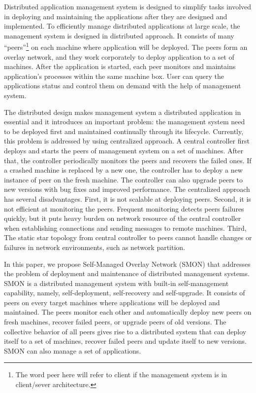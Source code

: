 Distributed application management system is designed to
simplify tasks involved in deploying and maintaining the
applications after they are designed and implemented.
To
efficiently manage distributed applications at large scale,
the management system is designed in distributed approach.
It consists of many ``peers''\footnote{The word peer here
will refer to client if the management system is in
client/sever architecture.} on each machine where
application will be deployed. The peers form an overlay
network, and they work corporately to deploy application to
a set of machines.  After the application is started, each
peer monitors and maintains application's processes within
the same machine box. User can query the applications status
and control them on demand with the help of management
system.

The distributed design makes management system a distributed
application in essential and it introduces an important
problem: the management system need to be deployed first and
maintained continually through its lifecycle. Currently,
this problem is addressed by using centralized approach. A
central controller first deploys and starts the peers of
management system on a set of machines. After that, the
controller periodically monitors the peers and recovers the
failed ones. If a crashed machine is replaced by a new one,
the controller has to deploy a new instance of peer on the
fresh machine. The controller can also upgrade peers to new
versions with bug fixes and improved performance. The
centralized approach has several disadvantages. First, it is
not scalable at deploying peers. Second, it is not efficient
at monitoring the peers. Frequent monitoring detects peers
failures quickly, but it puts heavy burden on network
resource of the central controller when establishing
connections and sending messages to remote machines. Third,
The static star topology from central controller to peers
cannot handle changes or failures in network
environments, such as network partition.

In this paper, we propose Self-Managed Overlay Network
(SMON) that addresses the problem of deployment and
maintenance of distributed management systems. SMON is a
distributed management system with built-in self-management
capability, namely, self-deployment, self-recovery and
self-upgrade. It consists of peers on every target machines
where applications will be deployed and maintained. The
peers monitor each other and automatically deploy new peers
on fresh machines, recover failed peers, or upgrade peers of
old versions. The collective behavior of all peers gives
rise to a distributed system that can deploy itself to a set
of machines, recover failed peers and update itself to new
versions. SMON can also manage a set of applications.

